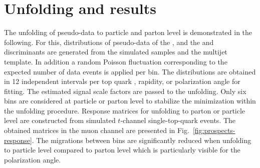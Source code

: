 
\section{Unfolding and results}

The unfolding of pseudo-data to particle and parton level is demonstrated in the following. For this, distributions of pseudo-data of the \mtw, and the \bdttt and \bdttch discriminants are generated from the simulated samples and the multijet template. In addition a random Poisson fluctuation corresponding to the expected number of data events is applied per bin. The distributions are obtained in 12 independent intervals per top quark \pt, rapidity, or polarization angle for fitting. The estimated signal scale factors are passed to the unfolding. Only six bins are considered at particle or parton level to stabilize the minimization within the \TUNFOLD unfolding procedure. Response matrices for unfolding to parton or particle level are constructed from simulated $t$-channel single-top-quark events. The obtained matrices in the muon channel are presented in Fig.~\ref{fig:prospects-response}. The migrations between bins are significantly reduced when unfolding to particle level compared to parton level which is particularly visible for the polarization angle.

